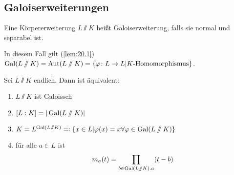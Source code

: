 \documentclass[12pt,a4paper]{scrartcl}
\begin{document}
\subsection{Galoiserweiterungen}
\begin{defi}
	Eine Körpererweiterung $L\sslash K$ heißt Galoiserweiterung, falls sie normal und separabel ist.
	
	In diesem Fall gilt (\ref{lem:20.1}) $\operatorname{Gal} (L\sslash K) = \operatorname{Aut} (L\sslash K) =\{\varphi\colon L\to L|K\text{-Homomorphismus}\}$.
\end{defi}

\begin{satz}[Galoiserweiterungen]\label{thm:21.1}
	Sei $L\sslash K$ endlich. Dann ist äquivalent:
	\begin{enumerate}
		\item $L\sslash K$ ist Galoissch
		\item $[L:K] = |\operatorname{Gal}(L\sslash K)|$
		\item $K = L^{\operatorname{Gal}(L\sslash K)}\eqqcolon\{x\in L|\varphi(x) = x\forall \varphi\in \operatorname{Gal}(L\sslash K)\}$
		\item für alle $a\in L$ ist $$m_a(t) = \prod_{b\in \operatorname{Gal}(L\sslash K).a}(t-b)$$
	\end{enumerate}
\end{satz}
\end{document}
